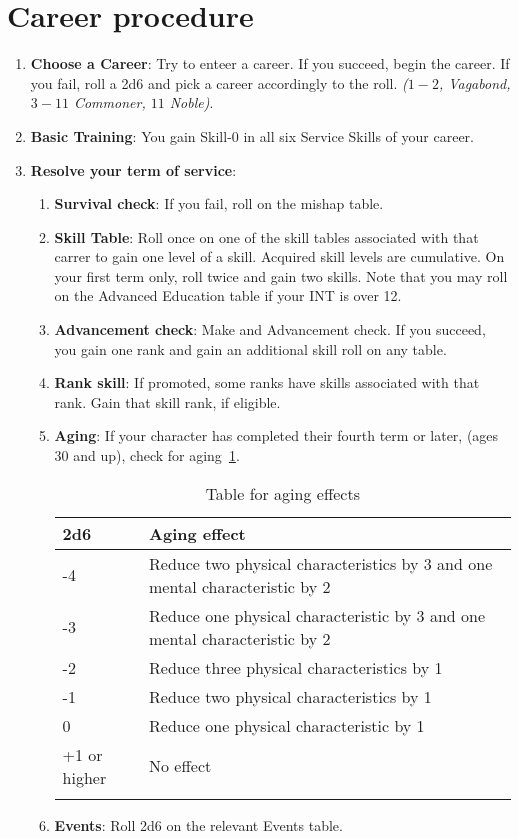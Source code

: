 \documentclass[itdr/core]{subfiles}
\begin{document}
\section{Career procedure}
\begin{enumerate}

  \item \textbf{Choose a Career}: Try to enteer a career. If you succeed, begin the career. If you fail, roll a 2d6 and
  pick a career accordingly to the roll. \emph{($1-2$, Vagabond, $3-11$ Commoner, $11$ Noble)}.

\item \textbf{Basic Training}: You gain Skill-0 in all six Service Skills of your career.

\item \textbf{Resolve your term of service}:
  \begin{enumerate}
    \item \textbf{Survival check}: If you fail, roll on the mishap table.
\item \textbf{Skill Table}: Roll once on one of the skill tables associated with that carrer to gain one level of a skill. Acquired skill levels are cumulative. On your first term only, roll twice and gain two skills. Note that you may roll on the Advanced Education table if your INT is over 12. 
\item \textbf{Advancement check}: Make and Advancement check. If you succeed, you gain one rank and gain an additional skill roll on any table.

\item \textbf{Rank skill}: If promoted, some ranks have skills associated with that rank. Gain that skill rank, if eligible.
\item \textbf{Aging}: If your character has completed their fourth term or later, (ages 30 and up), check for aging~\cref{tab:aging}.

\begin{longtable}{p{} p{}} %
\hline
\textbf{2d6} & \textbf{Aging effect} \\
\hline
-4 & Reduce two physical characteristics by 3 and one mental characteristic by 2 \\ 
-3 & Reduce one physical characteristic by 3 and one mental characteristic by 2 \\
-2 & Reduce three physical characteristics by 1 \\ 
-1 & Reduce two physical characteristics by 1 \\
 0 & Reduce one physical characteristic by 1 \\ 
+1 or higher & No effect \\
\hline
\caption{Table for aging effects}
\label{tab:aging}
\end{longtable}
  \item \textbf{Events}: Roll 2d6 on the relevant Events table.


\end{enumerate}
\end{enumerate}
\end{document}
